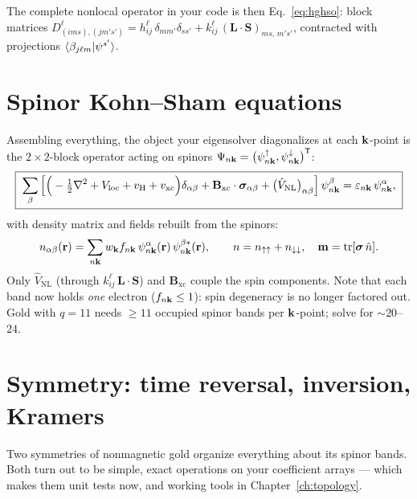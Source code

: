 The complete nonlocal operator in your code is then
Eq.~\eqref{eq:hghso}: block matrices
$D^{\ell}_{(im s),(j m' s')} = h^{\ell}_{ij}\,\delta_{mm'}\delta_{ss'}
+ k^{\ell}_{ij}\, (\mathbf L\cdot\mathbf S)_{ms,\,m's'}$,
contracted with projections $\braket{\beta_{j\ell m}|\psi^{s'}}$.

\section{Spinor Kohn--Sham equations}

Assembling everything, the object your eigensolver diagonalizes at each
$\mathbf{k}$-point is the $2\times2$-block operator acting on spinors
$\Psi_{n\mathbf{k}} = \big(\psi^{\uparrow}_{n\mathbf{k}}, \psi^{\downarrow}_{n\mathbf{k}}\big)^{\mathsf T}$:
\begin{equation}
\boxed{\;
\sum_{\beta}\Big[
\Big(-\tfrac12 \nabla^2 + V_{\mathrm{loc}} + v_{\mathrm{H}} + v_{\mathrm{xc}}\Big)
\delta_{\alpha\beta}
+ \mathbf B_{\mathrm{xc}}\cdot \bm\sigma_{\alpha\beta}
+ \big(\hat V_{\mathrm{NL}}\big)_{\alpha\beta}
\Big]\, \psi^{\beta}_{n\mathbf{k}}
= \varepsilon_{n\mathbf{k}}\, \psi^{\alpha}_{n\mathbf{k}},
\;}
\label{eq:spinorks}
\end{equation}
with density matrix and fields rebuilt from the spinors:
\begin{equation}
n_{\alpha\beta}(\mathbf{r}) = \sum_{n\mathbf{k}} w_{\mathbf{k}} f_{n\mathbf{k}}\,
\psi^{\alpha}_{n\mathbf{k}}(\mathbf{r})\, \psi^{\beta *}_{n\mathbf{k}}(\mathbf{r}),
\qquad
n = n_{\uparrow\uparrow} + n_{\downarrow\downarrow},
\quad
\mathbf m = \mathrm{tr}[\bm\sigma\, \hat n].
\end{equation}
Only $\hat V_{\mathrm{NL}}$ (through $k^{\ell}_{ij}\,\mathbf L\cdot\mathbf S$)
and $\mathbf B_{\mathrm{xc}}$ couple the spin components. Note that each
band now holds \emph{one} electron ($f_{n\mathbf{k}} \le 1$): spin degeneracy is no
longer factored out. Gold with $q{=}11$ needs $\ge 11$ occupied spinor bands
per $\mathbf{k}$-point; solve for $\sim 20$--$24$.

\section{Symmetry: time reversal, inversion, Kramers}
\label{sec:symmetry}

Two symmetries of nonmagnetic gold organize everything about its spinor
bands. Both turn out to be simple, exact operations on your coefficient
arrays --- which makes them unit tests now, and working tools in
Chapter~\ref{ch:topology}.

